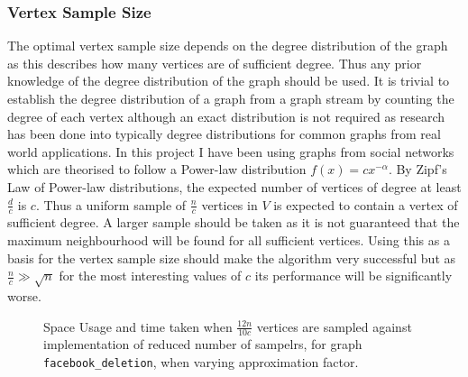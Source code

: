 \documentclass[11pt,twoside,a4paper]{report}
\begin{document}
\subsubsection{Vertex Sample Size}
\par The optimal vertex sample size depends on the degree distribution of the graph as this describes how many vertices are of sufficient degree. Thus any prior knowledge of the degree distribution of the graph should be used. It is trivial to establish the degree distribution of a graph from a graph stream by counting the degree of each vertex although an exact distribution is not required as research has been done into typically degree distributions for common graphs from real world applications. In this project I have been using graphs from social networks which are theorised \cite{socialNetworkDistribution} to follow a Power-law distribution $f(x)=cx^{-\alpha}$. By Zipf's Law of Power-law distributions, the expected number of vertices of degree at least $\frac{d}{c}$ is $c$. Thus a uniform sample of $\frac{n}c$ vertices in $V$ is expected to contain a vertex of sufficient degree. A larger sample should be taken as it is not guaranteed that the maximum neighbourhood will be found for all sufficient vertices. Using this as a basis for the vertex sample size should make the algorithm very successful but as $\frac{n}c\gg\sqrt{n}$ for the most interesting values of $c$ its performance will be significantly worse.

\begin{figure}[H]
	\label{Figure 17}
	\caption{Space Usage and time taken when $\frac{12n}{10c}$ vertices are sampled against implementation of reduced number of sampelrs, for graph \texttt{facebook\_deletion}, when varying approximation factor.}
\end{figure}
\end{document}
